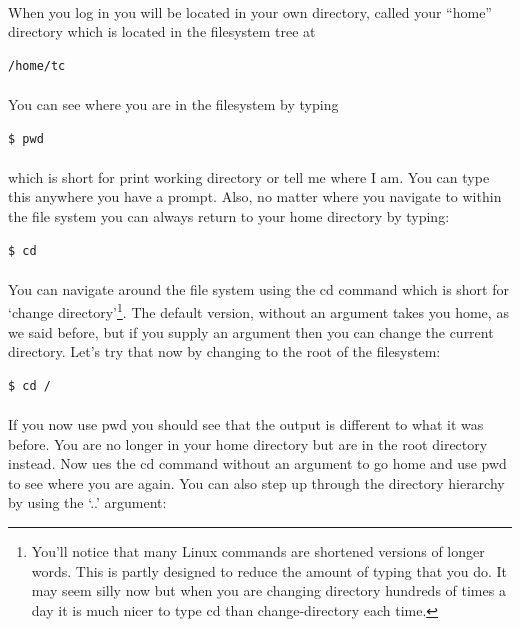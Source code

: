 \documentclass[12pt, a4paper, twoside]{book}
\begin{document}
\paragraph{} When you log in you will be located in your own directory, called your ``home'' directory which is located in the filesystem tree at 

\begin{lstlisting}[style=DOS]
    /home/tc
\end{lstlisting}
\paragraph{} You can see where you are in the filesystem by typing

\begin{lstlisting}[style=DOS]
    $ pwd
\end{lstlisting}
\paragraph{} which is short for print working directory or tell me where I am. You can type this anywhere you have a prompt. Also, no matter where you navigate to within the file system you can always return to your home directory by typing:

\begin{lstlisting}[style=DOS]
    $ cd
\end{lstlisting}

\paragraph{} You can navigate around the file system using the cd command which is short for `change directory'\footnote{You'll notice that many Linux commands are shortened versions of longer words. This is partly designed to reduce the amount of typing that you do. It may seem silly now but when you are changing directory hundreds of times a day it is much nicer to type cd than change-directory each time.}. The default version, without an argument takes you home, as we said before, but if you supply an argument then you can change the current directory. Let's try that now by changing to the root of the filesystem:

\begin{lstlisting}[style=DOS]
    $ cd /
\end{lstlisting}
\paragraph{} If you now use pwd you should see that the output is different to what it was before. You are no longer in your home directory but are in the root directory instead. Now ues the cd command without an argument to go home and use pwd to see where you are again. You can also step up through the directory hierarchy by using the `..' argument:
\end{document}

